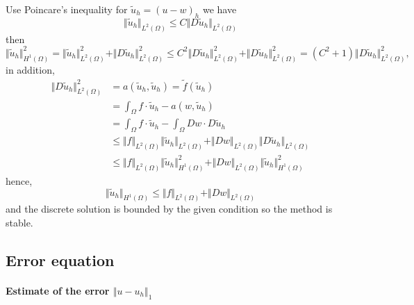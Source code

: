 \documentclass[11pt,letterpaper]{article}
\begin{document}
Use Poincare's inequality for $\tilde u_h= (u-w)_h$ we have
\begin{displaymath}
  \Vert \tilde u_h\Vert_{L^2(\Omega)}\leq C\Vert D\tilde u_h\Vert_{L^2(\Omega)}
\end{displaymath}
then
\begin{displaymath}
  \Vert \tilde u_h\Vert^2_{H^1(\Omega)}=\Vert \tilde u_h\Vert_{L^2(\Omega)}^2
  +\Vert D\tilde u_h\Vert_{L^2(\Omega)}^2
  \leq  C^2\Vert D\tilde u_h\Vert_{L^2(\Omega)}^2+ \Vert D\tilde u_h\Vert_{L^2(\Omega)}^2
  =(C^2+1) \Vert D\tilde u_h\Vert_{L^2(\Omega)}^2,
\end{displaymath}
in addition, 
\begin{displaymath}
  \begin{aligned}
    \Vert D\tilde u_h\Vert_{L^2(\Omega)}^2
    &=a(\tilde u_h,\tilde u_h)
      =\tilde f(\tilde u_h)\\
    &=\int_{\Omega}f\cdot  \tilde u_h-a(w, \tilde u_h)\\
    &=\int_{\Omega}f\cdot  \tilde u_h-\int_{\Omega}Dw\cdot D\tilde u_h\\
    &\leq \Vert f\Vert_{L^2(\Omega)}\Vert \tilde u_h\Vert_{L^2(\Omega)}
      +\Vert Dw\Vert_{L^2(\Omega)}\Vert D\tilde u_h\Vert_{L^2(\Omega)}\\
    &\leq \Vert f\Vert_{L^2(\Omega)} \Vert \tilde u_h\Vert^2_{H^1(\Omega)}
      +\Vert Dw\Vert_{L^2(\Omega)} \Vert \tilde u_h\Vert^2_{H^1(\Omega)}
  \end{aligned}
\end{displaymath}
hence,
\begin{displaymath}
  \Vert \tilde u_h\Vert_{H^1(\Omega)}\leq
   \Vert f\Vert_{L^2(\Omega)} +\Vert Dw\Vert_{L^2(\Omega)}
\end{displaymath}
and the discrete solution is bounded by the given condition so the method is stable.
\subsection{Error equation}

\paragraph{Estimate of the error $\Vert u-u_h\Vert_{1}$}
\end{document}

